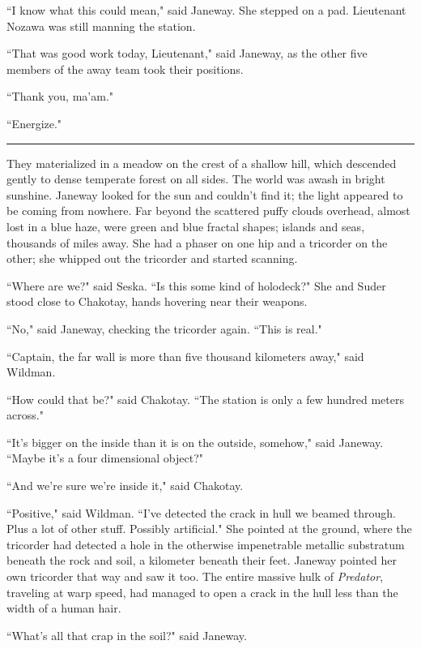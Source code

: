 \documentclass[twoside,letterpaper,12pt]{memoir}
\begin{document}
``I know what this could mean," said Janeway. She stepped on a pad. Lieutenant Nozawa was still manning the station. 

``That was good work today, Lieutenant," said Janeway, as the other five members of the away team took their positions. 

``Thank you, ma'am." 

``Energize." 

\begin{center}\rule{3cm}{0.4 pt}\end{center} 

They materialized in a meadow on the crest of a shallow hill, which descended gently to dense temperate forest on all sides. The world was awash in bright sunshine. Janeway looked for the sun and couldn't find it; the light appeared to be coming from nowhere. Far beyond the scattered puffy clouds overhead, almost lost in a blue haze, were green and blue fractal shapes; islands and seas, thousands of miles away. She had a phaser on one hip and a tricorder on the other; she whipped out the tricorder and started scanning. 

``Where are we?" said Seska. ``Is this some kind of holodeck?" She and Suder stood close to Chakotay, hands hovering near their weapons. 

``No," said Janeway, checking the tricorder again. ``This is real." 

``Captain, the far wall is more than five thousand kilometers away," said Wildman. 

``How could that be?" said Chakotay. ``The station is only a few hundred meters across." 

``It's bigger on the inside than it is on the outside, somehow," said Janeway. ``Maybe it’s a four dimensional object?" 

``And we're sure we're inside it," said Chakotay. 

``Positive," said Wildman. ``I've detected the crack in hull we beamed through. Plus a lot of other stuff. Possibly artificial." She pointed at the ground, where the tricorder had detected a hole in the otherwise impenetrable metallic substratum beneath the rock and soil, a kilometer beneath their feet. Janeway pointed her own tricorder that way and saw it too. The entire massive hulk of \textit{Predator}, traveling at warp speed, had managed to open a crack in the hull less than the width of a human hair. 

``What's all that crap in the soil?" said Janeway. 
\end{document}
